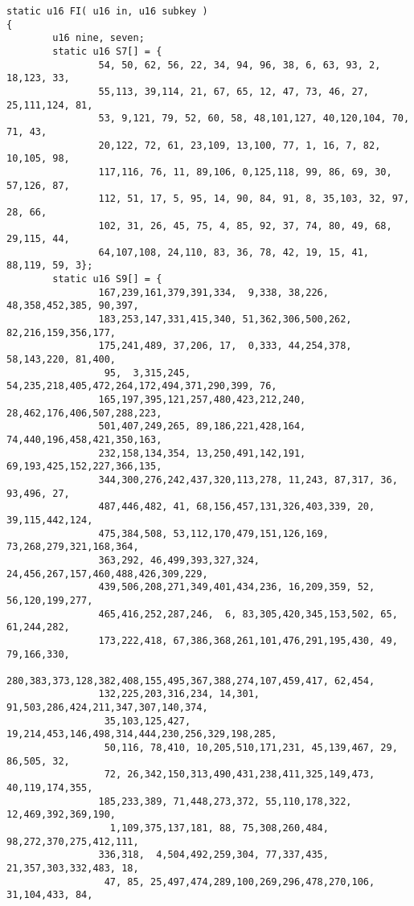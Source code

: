 \begin{verbatim}
static u16 FI( u16 in, u16 subkey )
{
        u16 nine, seven;
        static u16 S7[] = {
                54, 50, 62, 56, 22, 34, 94, 96, 38, 6, 63, 93, 2, 18,123, 33,
                55,113, 39,114, 21, 67, 65, 12, 47, 73, 46, 27, 25,111,124, 81,
                53, 9,121, 79, 52, 60, 58, 48,101,127, 40,120,104, 70, 71, 43,
                20,122, 72, 61, 23,109, 13,100, 77, 1, 16, 7, 82, 10,105, 98,
                117,116, 76, 11, 89,106, 0,125,118, 99, 86, 69, 30, 57,126, 87,
                112, 51, 17, 5, 95, 14, 90, 84, 91, 8, 35,103, 32, 97, 28, 66,
                102, 31, 26, 45, 75, 4, 85, 92, 37, 74, 80, 49, 68, 29,115, 44,
                64,107,108, 24,110, 83, 36, 78, 42, 19, 15, 41, 88,119, 59, 3};
        static u16 S9[] = {
                167,239,161,379,391,334,  9,338, 38,226, 48,358,452,385, 90,397,
                183,253,147,331,415,340, 51,362,306,500,262, 82,216,159,356,177,
                175,241,489, 37,206, 17,  0,333, 44,254,378, 58,143,220, 81,400,
                 95,  3,315,245, 54,235,218,405,472,264,172,494,371,290,399, 76,
                165,197,395,121,257,480,423,212,240, 28,462,176,406,507,288,223,
                501,407,249,265, 89,186,221,428,164, 74,440,196,458,421,350,163,
                232,158,134,354, 13,250,491,142,191, 69,193,425,152,227,366,135,
                344,300,276,242,437,320,113,278, 11,243, 87,317, 36, 93,496, 27,
                487,446,482, 41, 68,156,457,131,326,403,339, 20, 39,115,442,124,
                475,384,508, 53,112,170,479,151,126,169, 73,268,279,321,168,364,
                363,292, 46,499,393,327,324, 24,456,267,157,460,488,426,309,229,
                439,506,208,271,349,401,434,236, 16,209,359, 52, 56,120,199,277,
                465,416,252,287,246,  6, 83,305,420,345,153,502, 65, 61,244,282,
                173,222,418, 67,386,368,261,101,476,291,195,430, 49, 79,166,330,
                280,383,373,128,382,408,155,495,367,388,274,107,459,417, 62,454,
                132,225,203,316,234, 14,301, 91,503,286,424,211,347,307,140,374,
                 35,103,125,427, 19,214,453,146,498,314,444,230,256,329,198,285,
                 50,116, 78,410, 10,205,510,171,231, 45,139,467, 29, 86,505, 32,
                 72, 26,342,150,313,490,431,238,411,325,149,473, 40,119,174,355,
                185,233,389, 71,448,273,372, 55,110,178,322, 12,469,392,369,190,
                  1,109,375,137,181, 88, 75,308,260,484, 98,272,370,275,412,111,
                336,318,  4,504,492,259,304, 77,337,435, 21,357,303,332,483, 18,
                 47, 85, 25,497,474,289,100,269,296,478,270,106, 31,104,433, 84,

\end{verbatim}
